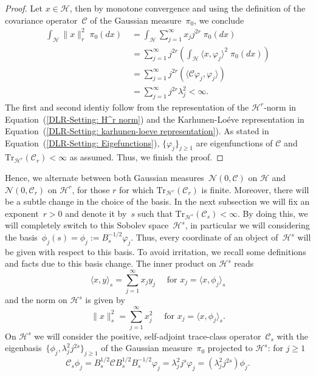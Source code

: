 \begin{proof}
 Let $x \in \mathcal{H}$, then by monotone convergence and using the definition of the covariance operator~$\mathcal{C}$ of the Gaussian measure~$\pi_0$, we conclude
 \begin{align*}
  \int_{\mathcal{H}} \| x \|_r^2 \; \pi_0 (dx) & \; = \int_{\mathcal{H}} \sum_{j=1}^{\infty} x_j j^{2r} \; \pi_0 (dx)  \\
  & \; = \sum_{j=1}^{\infty} j^{2r} ( \int_{\mathcal{H}}  \langle x, \varphi_j \rangle^2  \; \pi_0 (dx) )  \\
  & \; = \sum_{j=1}^{\infty} j^{2r} (   \langle \mathcal{C} \varphi_j, \varphi_j \rangle   )    \\
  & \; = \sum_{j=1}^{\infty} j^{2r} \lambda_j^2 < \infty.
 \end{align*}
 The first and second identiy follow from the representation of the $\mathcal{H}^r$-norm in Equation~(\ref{DLR-Setting: H^r norm}) and the Karhunen-Lo\'{e}ve representation in Equation~(\ref{DLR-Setting: karhunen-loeve representation}). As stated in Equation~(\ref{DLR-Setting: Eigefunctions}), $\{  \varphi_j \}_{j \geq 1}$ are eigenfunctions of $\mathcal{C}$ and $\text{Tr}_{\mathcal{H}^r}(\mathcal{C}_r) < \infty$ as assumed. Thus, we finish the proof.

\end{proof}

Hence, we alternate between both Gaussian measures~$\mathcal{N}(0, \mathcal{C})$ on $\mathcal{H}$ and $\mathcal{N}(0, \mathcal{C}_r)$ on $\mathcal{H}^r$, for those $r$ for which $\text{Tr}_{\mathcal{H}^r}(\mathcal{C}_r)$ is finite. Moreover, there will be a subtle change in the choice of the basis. In the next subsection we will fix an exponent~$r>0$ and denote it by~$s$ such that $\text{Tr}_{\mathcal{H}^s}(\mathcal{C}_s) < \infty$. By doing this, we will completely switch to this Sobolev space~$\mathcal{H}^s$, in particular we will considering the basis~$\phi_j(s) = \phi_j := B^{-1/2}_s \varphi_j$. Thus, every coordinate of an object of~$\mathcal{H}^s$ will be given with respect to this basis. To avoid irritation, we recall some definitions and facts due to this basis change. The inner product on $\mathcal{H}^s$ reads
\begin{equation}
  \langle x, y \rangle_s = \sum_{j=1}^{\infty} x_j y_j \quad \text{ for } x_j = \langle x, \phi_j\rangle_s
\end{equation}
and the norm on $\mathcal{H}^s$ is given by
\begin{equation}
  \| x \|_s^2 = \sum_{j=1}^{\infty} x_j^2 \quad \text{ for } x_j = \langle x, \phi_j\rangle_s.
\end{equation}
On $\mathcal{H}^s$ we will consider the positive, self-adjoint trace-class operator~$\mathcal{C}_s$ with the eigenbasis~$\{ \phi_j,  \lambda_j^2 j^{2s} \}_{j \geq 1}$ of the Gaussian measure~$\pi_0$ projected to $\mathcal{H}^s$: for $j \geq 1$
\begin{equation}
\label{DLR-Setting: Definition Eigefunctions of C_s}
   \mathcal{C}_s \phi_j = B_s^{1/2} \mathcal{C}B^{1/2}_sB^{-1/2}_s \varphi_j  =  \lambda_j^2 j^s \varphi_j = ( \lambda_j^2 j^{2s}) \phi_j.
\end{equation}


